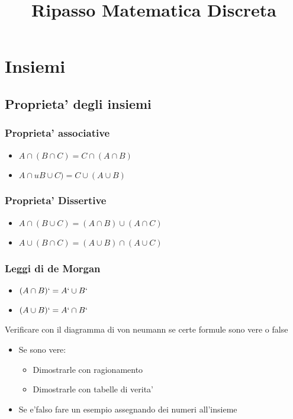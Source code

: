\documentclass{article}
\title{Ripasso Matematica Discreta}
\begin{document}
  \section{Insiemi}
  \subsection{Proprieta' degli insiemi}
  \subsubsection*{Proprieta' associative}
  \begin{itemize}
    \item $A \cap (B \cap C)=C\cap (A \cap B)$
    \item $A \cap uB \cup C)=C\cup (A \cup B)$
  \end{itemize}
  \subsubsection*{Proprieta' Dissertive}
  \begin{itemize}
    \item $A \cap (B \cup C)=(A\cap B)\cup(A\cap C)$
    \item $A \cup (B \cap C)=(A\cup B)\cap(A\cup C)$
  \end{itemize}
  \subsubsection*{Leggi di de Morgan}
  \begin{itemize}
    \item $(A\cap B)`=A`\cup B`$
    \item $(A\cup B)`=A`\cap B`$
  \end{itemize}
  \begin{flushleft}
    Verificare con il diagramma di von neumann se certe formule sono vere o false
  \end{flushleft}
  \begin{itemize}
    \item Se sono vere:
      \begin{itemize}
        \item Dimostrarle con ragionamento
        \item Dimostrarle con tabelle di verita'
      \end{itemize}
    \item Se e'falso fare un esempio assegnando dei numeri all'insieme
  \end{itemize}
\end{document}
